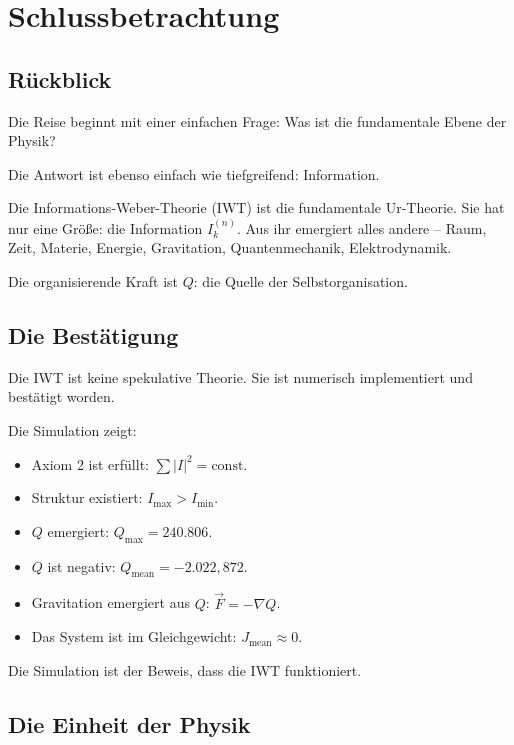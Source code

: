 \chapter{Schlussbetrachtung}

\section{Rückblick}

Die Reise beginnt mit einer einfachen Frage: Was ist die fundamentale Ebene der Physik?

Die Antwort ist ebenso einfach wie tiefgreifend: Information.

Die Informations-Weber-Theorie (IWT) ist die fundamentale Ur-Theorie. Sie hat nur eine Größe: die Information \( I_k^{(n)} \). Aus ihr emergiert alles andere – Raum, Zeit, Materie, Energie, Gravitation, Quantenmechanik, Elektrodynamik.

Die organisierende Kraft ist \( Q \): die Quelle der Selbstorganisation.

\section{Die Bestätigung}

Die IWT ist keine spekulative Theorie. Sie ist numerisch implementiert und bestätigt worden.

Die Simulation zeigt:

\begin{itemize}
\item Axiom 2 ist erfüllt: \( \sum |I|^2 = \text{const} \).
\item Struktur existiert: \( I_{\text{max}} > I_{\text{min}} \).
\item \( Q \) emergiert: \( Q_{\text{max}} = 240.806 \).
\item \( Q \) ist negativ: \( Q_{\text{mean}} = -2.022,872 \).
\item Gravitation emergiert aus \( Q \): \( \vec{F} = -\nabla Q \).
\item Das System ist im Gleichgewicht: \( J_{\text{mean}} \approx 0 \).
\end{itemize}

Die Simulation ist der Beweis, dass die IWT funktioniert.

\section{Die Einheit der Physik}

